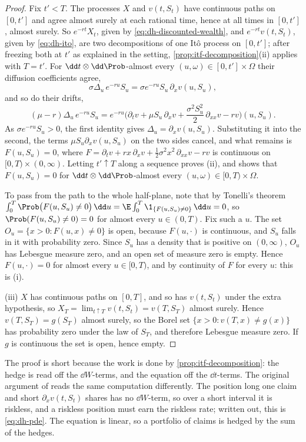 \begin{proof}
Fix $t'<T$. The processes $X$ and $v(t,S_t)$ have continuous paths on $[0,t']$ and agree
almost surely at each rational time, hence at all times in $[0,t']$, almost surely. So
$e^{-rt}X_t$, given by \eqref{eq:dh-discounted-wealth}, and $e^{-rt}v(t,S_t)$, given by
\eqref{eq:dh-ito}, are two decompositions of one It\^o process on $[0,t']$; after freezing
both at $t'$ as explained in the setting, \cref{prop:itf-decomposition}(ii) applies with $T=t'$. For $\dd t\otimes\dd\Prob$-almost every
$(u,\omega)\in[0,t']\times\Omega$ their diffusion coefficients agree,
\[
  \sigma\Delta_u\,e^{-ru}S_u=\sigma e^{-ru}S_u\,\partial_xv(u,S_u),
\]
and so do their drifts,
\[
  (\mu-r)\Delta_u\,e^{-ru}S_u=e^{-ru}\Big(\partial_tv+\mu S_u\,\partial_xv+\frac{\sigma^2S_u^2}{2}\,\partial_{xx}v-rv\Big)(u,S_u).
\]
As $\sigma e^{-ru}S_u>0$, the first identity gives $\Delta_u=\partial_xv(u,S_u)$. Substituting
it into the second, the terms $\mu S_u\partial_xv(u,S_u)$ on the two sides cancel, and what
remains is $F(u,S_u)=0$, where
$F=\partial_tv+rx\,\partial_xv+\frac12\sigma^2x^2\,\partial_{xx}v-rv$ is continuous on
$[0,T)\times(0,\infty)$. Letting $t'\uparrow T$ along a sequence proves (ii), and shows that
$F(u,S_u)=0$ for $\dd t\otimes\dd\Prob$-almost every $(u,\omega)\in[0,T)\times\Omega$.

To pass from the path to the whole half-plane, note that by Tonelli's theorem
$\int_0^T\Prob\big(F(u,S_u)\ne0\big)\,\dd u=\E\int_0^T\1_{\{F(u,S_u)\ne0\}}\,\dd u=0$, so
$\Prob(F(u,S_u)\ne0)=0$ for almost every $u\in(0,T)$. Fix such a $u$. The set
$O_u=\{x>0:F(u,x)\ne0\}$ is open, because $F(u,\cdot)$ is continuous, and $S_u$ falls in it with
probability zero. Since $S_u$ has a density that is positive on $(0,\infty)$, $O_u$ has
Lebesgue measure zero, and an open set of measure zero is empty. Hence $F(u,\cdot)=0$ for
almost every $u\in[0,T)$, and by continuity of $F$ for every $u$: this is (i).

(iii) $X$ has continuous paths on $[0,T]$, and so has $v(t,S_t)$ under the extra hypothesis, so
$X_T=\lim_{t\uparrow T}v(t,S_t)=v(T,S_T)$ almost surely. Hence $v(T,S_T)=g(S_T)$ almost surely,
so the Borel set $\{x>0:v(T,x)\ne g(x)\}$ has probability zero under the law of $S_T$, and
therefore Lebesgue measure zero. If $g$ is continuous the set is open, hence empty.
\end{proof}

The proof is short because the work is done by \cref{prop:itf-decomposition}: the hedge is
read off the $\dd W$-terms, and the equation off the $\dd t$-terms. The original argument of
\textcite{black-scholes} reads the same computation differently. The position long one claim
and short $\partial_xv(t,S_t)$ shares has no $\dd W$-term, so over a short interval it is
riskless, and a riskless position must earn the riskless rate; written out, this is
\eqref{eq:dh-pde}. The equation is linear, so a portfolio of claims is hedged by the sum of
the hedges.

